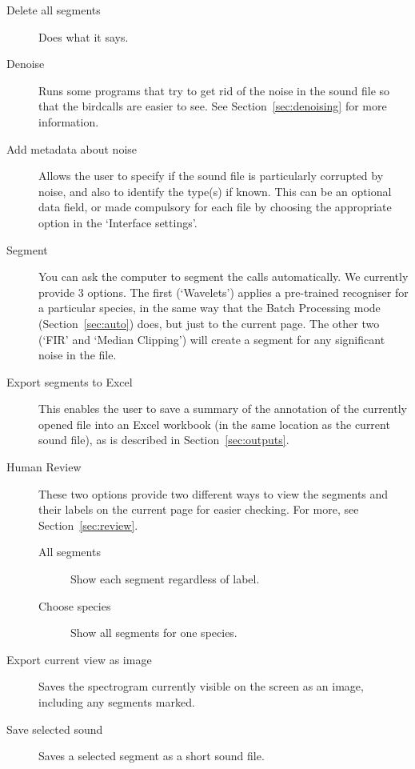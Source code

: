\documentclass{article}
\begin{document}
\begin{description}
\item [Delete all segments] Does what it says. 
\item [Denoise] Runs some programs that try to get rid of the noise in the sound file so that the birdcalls are easier to see. %
See Section~\ref{sec:denoising} for more information.
\item [Add metadata about noise] Allows the user to specify if the sound file is particularly corrupted by noise, and also to identify the type(s) if known. This can be an optional data field, or made compulsory for each file by choosing the appropriate option in the `Interface settings'.
\item [Segment] You can ask the computer to segment the calls automatically. We currently provide 3 options. The first (`Wavelets') applies a pre-trained recogniser for a particular species, in the same way that the Batch Processing mode (Section~\ref{sec:auto}) does, but just to the current page. The other two (`FIR' and `Median Clipping') will create a segment for any significant noise in the file. 
\item [Export segments to Excel] This enables the user to save a summary of the annotation of the currently opened file into an Excel workbook (in the same location as the current sound file), as is described in Section~\ref{sec:outputs}. 
\item [Human Review] These two options provide two different ways to view the segments and their labels on the current page for easier checking. For more, see Section~\ref{sec:review}.
\begin{description}
\item[All segments] Show each segment regardless of label.
\item[Choose species] Show all segments for one species.
\end{description}
\item [Export current view as image] Saves the spectrogram currently visible on the screen as an image, including any segments marked. 
\item [Save selected sound] Saves a selected segment as a short sound file.
\end{description}
\end{document}
